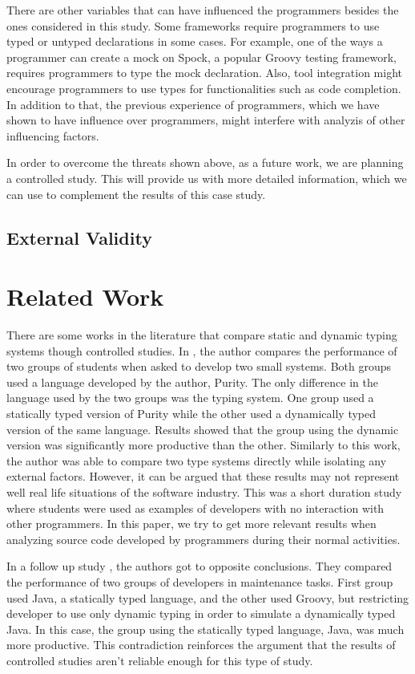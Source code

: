 \documentclass[preprint]{sigplanconf}
\begin{document}
There are other variables that can have influenced the programmers besides the ones considered in this study.
Some frameworks require programmers to use typed or untyped declarations in some cases.
For example, one of the ways a programmer can create a mock on Spock, a popular Groovy testing framework, requires programmers to type the mock declaration.
Also, tool integration might encourage programmers to use types for functionalities such as code completion.
In addition to that, the previous experience of programmers, which we have shown to have influence over programmers, might interfere with analyzis of other influencing factors.

In order to overcome the threats shown above, as a future work, we are planning a controlled study.
This will provide us with more detailed information, which we can use to complement the results of this case study.

\subsection*{External Validity}


\section{Related Work\label{sec:Trabalhos-Relacionados}}
There are some works in the literature that compare static and dynamic typing systems though controlled studies.
In \cite{experiment_with_purity}, the author compares the performance of two groups of students when asked to develop two small systems. 
Both groups used a language developed by the author, Purity. 
The only difference in the language used by the two groups was the typing system.
One group used a statically typed version of Purity while the other used a dynamically typed version of the same language.
Results showed that the group using the dynamic version was significantly more productive than the other. 
Similarly to this work, the author was able to compare two type systems directly while isolating any external factors. 
However, it can be argued that these results may not represent well real life situations of the software industry. 
This was a short duration study where students were used as examples of developers with no interaction with other programmers. 
In this paper, we try to get more relevant results when analyzing source code developed by programmers during their normal activities.

In a follow up study \cite{hanenberg_icpc}, the authors got to opposite conclusions. 
They compared the performance of two groups of developers in maintenance tasks. 
First group used Java, a statically typed language, and the other used Groovy, but restricting developer to use only dynamic typing in order to simulate a dynamically typed Java.
In this case, the group using the statically typed language, Java, was much more productive.
This contradiction reinforces the argument that the results of controlled studies aren't reliable enough for this type of study.
\end{document}
